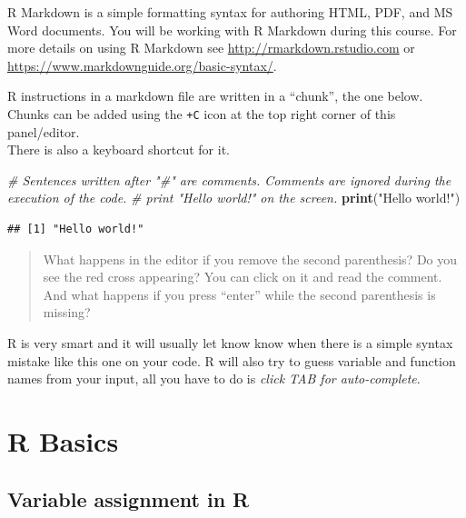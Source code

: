 \documentclass[
]{book}
\newenvironment{Shaded}{\begin{snugshade}}{\end{snugshade}}
\newcommand{\CommentTok}[1]{\textcolor[rgb]{0.56,0.35,0.01}{\textit{#1}}}
\newcommand{\FunctionTok}[1]{\textcolor[rgb]{0.13,0.29,0.53}{\textbf{#1}}}
\newcommand{\NormalTok}[1]{#1}
\newcommand{\StringTok}[1]{\textcolor[rgb]{0.31,0.60,0.02}{#1}}
\begin{document}
R Markdown is a simple formatting syntax for authoring HTML, PDF, and MS Word documents.
You will be working with R Markdown during this course.
For more details on using R Markdown see \url{http://rmarkdown.rstudio.com} or \url{https://www.markdownguide.org/basic-syntax/}.

R instructions in a markdown file are written in a ``chunk'', the one below.\\
Chunks can be added using the \texttt{+C} icon at the top right corner of this panel/editor.\\
There is also a keyboard shortcut for it.

\begin{Shaded}
\begin{Highlighting}[]
\CommentTok{\# Sentences written after "\#" are comments. Comments are ignored during the execution of the code.}
\CommentTok{\# print "Hello world!" on the screen.}
\FunctionTok{print}\NormalTok{(}\StringTok{"Hello world!"}\NormalTok{)}
\end{Highlighting}
\end{Shaded}

\begin{verbatim}
## [1] "Hello world!"
\end{verbatim}

\begin{quote}
What happens in the editor if you remove the second parenthesis?
Do you see the red cross appearing?
You can click on it and read the comment.\\
And what happens if you press ``enter'' while the second parenthesis is missing?\\
\end{quote}

R is very smart and it will usually let know know when there is a simple syntax mistake like this one on your code.
R will also try to guess variable and function names from your input, all you have to do is \emph{click TAB for auto-complete}.

\hypertarget{r-basics}{%
\section*{R Basics}\label{r-basics}}

\hypertarget{variable-assignment-in-r}{%
\subsection*{Variable assignment in R}\label{variable-assignment-in-r}}
\end{document}
